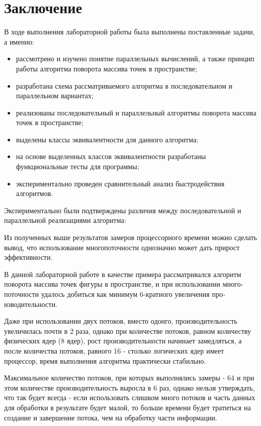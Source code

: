 \chapter*{Заключение}

В ходе выполнения лабораторной работы была выполнены поставленные задачи, а именно:

\begin{itemize}
	\item рассмотрено и изучено понятие параллельных вычислений, а также принцип ра­боты 
	алгоритма поворота массива точек в пространстве;
	\item разработана схема рассматриваемого алгоритма в последовательном
	и параллельном вариантах;
	\item реализованы последовательный и параллельный алгоритмы поворо­та
	массива точек в пространстве;
	\item выделены классы эквивалентности для данного алгоритма;
	\item на основе выделенных классов эквивалентности 
	разработаны функциональные тесты для программы;
	\item экспериментально проведен сравнительный анализ быстродействия алгоритмов.
\end{itemize}

Экспериментально были подтверждены различия между последо­вательной и 
параллельной реализациями алгоритма:

Из полученных выше результатов замеров процессорного време­ни
можно сделать вывод, что использование многопоточности однознач­но 
может дать прирост эффективности. 

В данной лабора­торной работе в качестве примера рассматривался алгоритм поворота
массива точек фигуры в пространстве, и при использовании много­
поточности удалось добиться как минимум 6-кратного увеличения про­изводительности.

Даже при использовании двух потоков, вместо одонго, производительность увеличилась почти в
2 раза, однако при количестве потоков, равном количеству физических ядер (8 ядер), рост про­изводительности
начинает замедляться, а после количества потоков, равного 16 - столько логических ядер 
имеет процессор, время выполнения алгоритма практически стабильно.

Максимальное количество потоков, при которых выполнялись за­меры - 64
и при этом количестве производительность выросла в 6 раз, 
однако нельзя утверждать, что так будет всегда - если использовать слишком 
много потоков и часть данных для обработки в результате будет малой, то больше времени
бу­дет тратиться на создание и завершение потока, чем на обработку части
информации.

